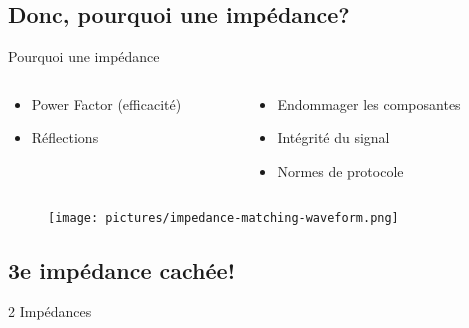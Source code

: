 \subsection{Donc, pourquoi une impédance?}

\begin{frame}{Pourquoi une impédance}
    \begin{columns}
        \begin{column}{0.5\textwidth}
            \begin{itemize}
                \item Power Factor (efficacité)
                \item Réflections
            \end{itemize}
        \end{column}
        \begin{column}{0.5\textwidth}
            \begin{itemize}
                \item Endommager les composantes
                \item Intégrité du signal
                \item Normes de protocole
            \end{itemize}
        \end{column}
    \end{columns}
    \begin{figure}
        \centering
        \texttt{[image: pictures/impedance-matching-waveform.png]}
    \end{figure}
\end{frame}


\subsection{3e impédance cachée!}

\begin{frame}{2 Impédances}
\end{frame}

